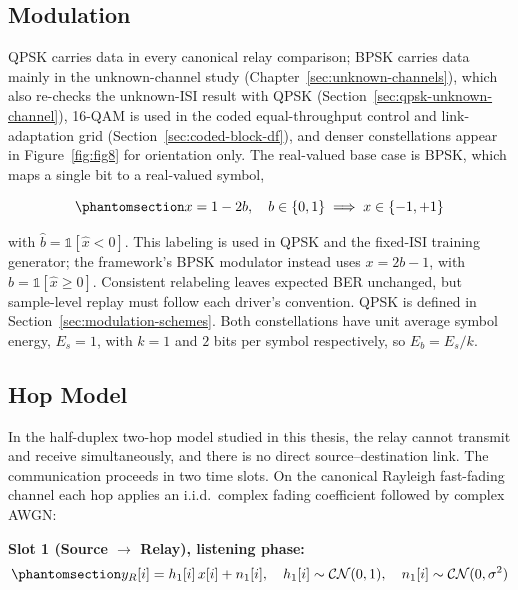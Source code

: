 \subsection{Modulation}\label{sec:modulation}
QPSK carries data in every canonical relay comparison; BPSK carries data mainly in the unknown-channel study (Chapter~\ref{sec:unknown-channels}), which also re-checks the unknown-ISI result with QPSK (Section~\ref{sec:qpsk-unknown-channel}), 16-QAM is used in the coded equal-throughput control and link-adaptation grid (Section~\ref{sec:coded-block-df}), and denser constellations appear in Figure~\ref{fig:fig8} for orientation only. The real-valued base case is BPSK, which maps a single bit to a real-valued symbol,

\begin{equation}\protect\phantomsection\label{eq:bpsk-mapping}{x = 1 - 2b, \quad b \in \{0, 1\} \implies x \in \{-1, +1\}}\end{equation}

with \(\hat{b} = \mathbb{1}[\hat{x} < 0]\). This labeling is used in QPSK and the fixed-ISI training generator; the framework's BPSK modulator instead uses \(x=2b-1\), with \(\hat{b}=\mathbb{1}[\hat{x}\geq0]\). Consistent relabeling leaves expected BER unchanged, but sample-level replay must follow each driver's convention. QPSK is defined in Section~\ref{sec:modulation-schemes}. Both constellations have unit average symbol energy, \(E_s=1\), with \(k=1\) and \(2\) bits per symbol respectively, so \(E_b=E_s/k\).

\subsection{Hop Model}\label{sec:hop-model}\label{sec:two-hop-relay-model}

In the half-duplex two-hop model studied in this thesis, the relay cannot transmit and receive simultaneously, and there is no direct source--destination link. The communication proceeds in two time slots. On the canonical Rayleigh fast-fading channel each hop applies an i.i.d.\ complex fading coefficient followed by complex AWGN:

\textbf{Slot 1 (Source $\to$ Relay), listening phase:} \begin{equation}\protect\phantomsection\label{eq:rayleigh-hop1}{y_R[i] = h_1[i]\,x[i] + n_1[i], \quad h_1[i] \sim \mathcal{CN}(0, 1), \quad n_1[i] \sim \mathcal{CN}(0, \sigma^2)
}\end{equation}

